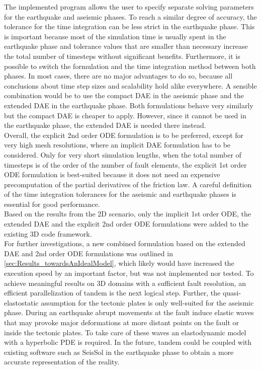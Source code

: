 The implemented program allows the user to specify separate solving parameters for the earthquake and aseismic phases. To reach a similar degree of accuracy, the tolerance for the time integration can be less strict in the earthquake phase. This is important because most of the simulation time is usually spent in the earthquake phase and tolerance values that are smaller than necessary increase the total number of timesteps without significant benefits. Furthermore, it is possible to switch the formulation and the time integration method between both phases. In most cases, there are no major advantages to do so, because all conclusions about time step sizes and scalability hold alike everywhere. A sensible combination would be to use the compact DAE in the aseismic phase and the extended DAE in the earthquake phase. Both formulations behave very similarly but the compact DAE is cheaper to apply. However, since it cannot be used in the earthquake phase, the extended DAE is needed there instead. \\

Overall, the explicit 2nd order ODE formulation is to be preferred, except for very high mesh resolutions, where an implicit DAE formulation has to be considered. Only for very short simulation lengths, when the total number of timesteps is of the order of the number of fault elements, the explicit 1st order ODE formulation is best-suited because it does not need an expensive precomputation of the partial derivatives of the friction law. A careful definition of the time integration tolerances for the aseismic and earthquake phases is essential for good performance. \\

Based on the results from the 2D scenario, only the implicit 1st order ODE, the extended DAE and the explicit 2nd order ODE formulations were added to the existing 3D code framework. \\

For further investigations, a new combined formulation based on the extended DAE and 2nd order ODE formulations was outlined in \autoref{sec:Results_towardsAnIdealModel}, which likely would have increased the execution speed by an important factor, but was not implemented nor tested. To achieve meaningful results on 3D domains with a sufficient fault resolution, an efficient parallelization of {\ttfamily tandem} is the next logical step. Further, the quasi-elastostatic assumption for the tectonic plates is only well-suited for the aseismic phase. During an earthquake abrupt movements at the fault induce elastic waves that may provoke major deformations at more distant points on the fault or inside the tectonic plates. To take care of these waves an elastodynamic model with a hyperbolic PDE is required. In the future, {\ttfamily tandem} could be coupled with existing software such as {\ttfamily SeisSol} in the earthquake phase to obtain a more accurate representation of the reality.
